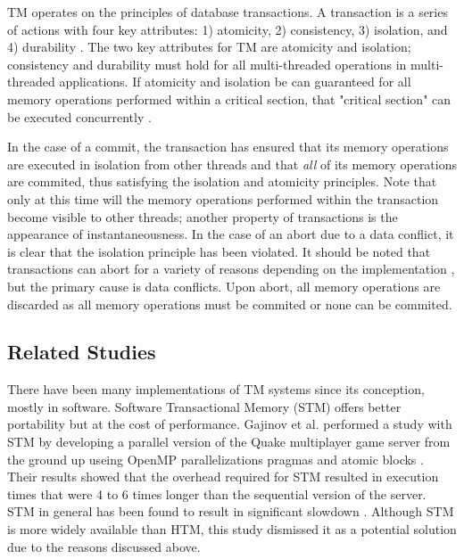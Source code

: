 \documentclass[a4paper]{article}
\begin{document}
\indent 
TM operates on the principles of database transactions.  A transaction
is a series of actions with four key attributes: 1) atomicity, 2) consistency,
3) isolation, and 4) durability \cite{tm_2nd}.  The two key attributes for TM
are atomicity and isolation; consistency and durability must hold for all
multi-threaded operations in multi-threaded applications.  If atomicity and
isolation be can guaranteed for all memory operations performed within a
critical section, that "critical section" can be executed concurrently
\cite{sle_rajwar}.
\par 

\indent 
In the case of a commit, the transaction has ensured that its memory
operations are executed in isolation from other threads and that \textit{all} of its
memory operations are commited, thus satisfying the isolation and
atomicity principles.  Note that only at this time will the memory operations
performed within the transaction become visible to other threads; another
property of transactions is the appearance of instantaneousness.  In the case
of an abort due to a data conflict, it is clear that the isolation principle has
been violated.  It should be noted that transactions can abort for a variety of
reasons depending on the implementation \cite{intel_opt_man,chung_amd}, but the
primary cause is data conflicts.  Upon abort, all memory operations are
discarded as all memory operations must be commited or none can be commited.
\par

\subsection{\textbf{Related Studies}}

\indent 
There have been many implementations of TM systems since its conception, mostly
in software.  Software Transactional Memory (STM) offers better portability but
at the cost of performance.  Gajinov et al. performed a study with STM by
developing a parallel version of the Quake multiplayer game server from the
ground up useing OpenMP parallelizations pragmas and atomic blocks
\cite{quake_stm}.  Their results showed that the overhead required for STM
resulted in execution times that were 4 to 6 times longer than the sequential
version of the server.  STM in general has been found to result in significant
slowdown \cite{stm_cascaval}.  Although STM is more widely available than HTM,
this study dismissed it as a potential solution due to the reasons discussed
above.
\par
\end{document}
